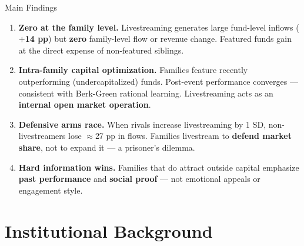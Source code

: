 \documentclass[11pt, aspectratio=169]{beamer}
\newcommand{\hl}[1]{\textcolor{myblue}{\textbf{#1}}}
\newcommand{\hlg}[1]{\textcolor{mygold}{\textbf{#1}}}
\begin{document}
\begin{frame}{Main Findings}

\begin{enumerate}\addtolength{\itemsep}{0.18cm}

  \item[\hlg{(1)}] \textbf{Zero at the family level.}
  Livestreaming generates large fund-level inflows (\hl{$+$14 pp}) but
  \hl{zero} family-level flow or revenue change.
  Featured funds gain at the direct expense of non-featured siblings.

  \item[\hlg{(2)}] \textbf{Intra-family capital optimization.}
  Families feature recently outperforming (undercapitalized) funds.
  Post-event performance converges --- consistent with Berk-Green
  rational learning. Livestreaming acts as an \hl{internal open market operation}.

  \item[\hlg{(3)}] \textbf{Defensive arms race.}
  When rivals increase livestreaming by 1 SD, non-livestreamers
  lose $\approx$27 pp in flows. Families livestream to
  \hl{defend market share}, not to expand it --- a prisoner's dilemma.

  \item[\hlg{(4)}] \textbf{Hard information wins.}
  Families that do attract outside capital emphasize
  \hl{past performance} and \hl{social proof} ---
  not emotional appeals or engagement style.

\end{enumerate}

\end{frame}

\section{Institutional Background}
\end{document}

